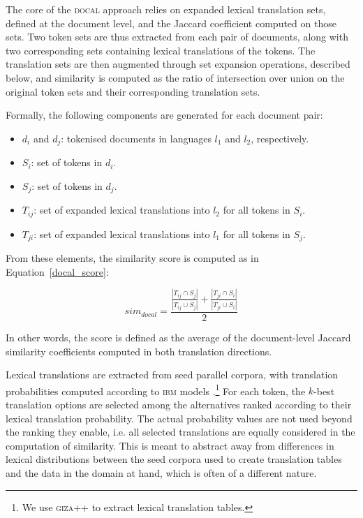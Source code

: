 \documentclass[11pt]{article}
\begin{document}
The core of the \textsc{docal} approach relies on expanded lexical translation sets, defined at the document level, and the Jaccard coefficient computed on those sets. Two token sets are thus extracted from each pair of documents, along with two corresponding sets containing lexical translations of the tokens. The translation sets are then augmented through set expansion operations, described below, and similarity is computed as the ratio of intersection over union on the original token sets and their corresponding translation sets. 

Formally, the following components are generated for each document pair: 

\begin{itemize}

\item $d_i$ and $d_j$: tokenised documents in languages $l_1$ and $l_2$, respectively.

\item $S_i$: set of tokens in $d_i$.

\item $S_j$: set of tokens in $d_j$.

\item $T_{ij}$: set of expanded lexical translations into $l_2$ for all tokens in $S_i$.

\item $T_{ji}$: set of expanded lexical translations into $l_1$ for all tokens in $S_j$.

\end{itemize}

From these elements, the similarity score is computed as in Equation~\ref{docal_score}:

\begin{equation} \label{docal_score} 
sim_{docal} = \frac{\frac{|T_{ij} \cap S_j|}{|T_{ij} \cup  S_j|} + \frac{|T_{ji}  \cap S_i|}{|T_{ji}  \cup S_i|}}{2} 
\end{equation}

In other words, the score is defined as the average of the document-level Jaccard similarity coefficients computed in both translation directions. 

Lexical translations are extracted from seed parallel corpora, with translation probabilities computed according to \textsc{ibm} models \cite{brown1993mathsmt}.\footnote{We use \textsc{giza++} \cite{och2003compalign} to extract lexical translation tables.} For each token, the $k$-best translation options are selected among the alternatives ranked according to their lexical translation probability. The actual probability values are not used beyond the ranking they enable, i.e. all selected translations are equally considered in the computation of similarity. This is meant to abstract away from differences in lexical distributions between the seed corpora used to create translation tables and the data in the domain at hand, which is often of a different nature.
\end{document}
